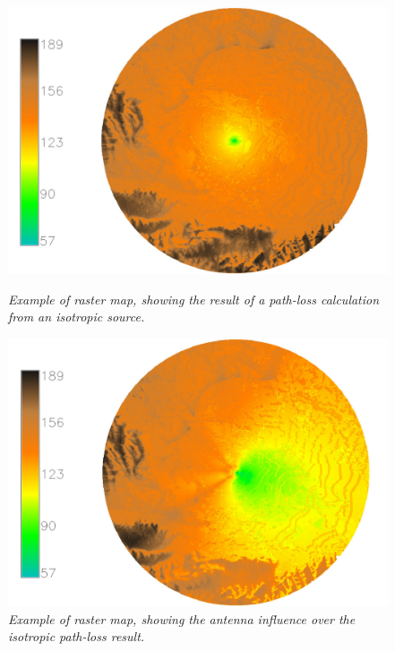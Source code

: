 \begin{figure}
\begin{minipage}[t]{0.49\textwidth}%
\centering

\includegraphics[width=0.8\columnwidth]{04-framework_design_and_implementation/img/isotrophic_calculation}

\caption{\textit{\emph{Example of raster map, showing the result of a path-loss
calculation from an isotropic source.\label{fig:path_loss-example}}}}
%
\end{minipage}\hfill{}%
\begin{minipage}[t]{0.49\textwidth}%
\centering

\includegraphics[width=0.8\columnwidth]{04-framework_design_and_implementation/img/antenna_calculation}

\caption{\textit{\emph{Example of raster map, showing the antenna influence
over the isotropic path-loss result.\label{fig:antenna-example}}}}
%
\end{minipage}
\end{figure}



